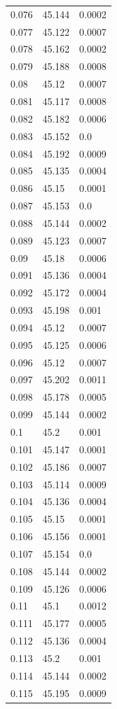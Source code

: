 \begin{table}[H]
\begin{tabular}{lll}
0.076 & 45.144 & 0.0002 \\
0.077 & 45.122 & 0.0007 \\
0.078 & 45.162 & 0.0002 \\
0.079 & 45.188 & 0.0008 \\
0.08 & 45.12 & 0.0007 \\
0.081 & 45.117 & 0.0008 \\
0.082 & 45.182 & 0.0006 \\
0.083 & 45.152 & 0.0 \\
0.084 & 45.192 & 0.0009 \\
0.085 & 45.135 & 0.0004 \\
0.086 & 45.15 & 0.0001 \\
0.087 & 45.153 & 0.0 \\
0.088 & 45.144 & 0.0002 \\
0.089 & 45.123 & 0.0007 \\
0.09 & 45.18 & 0.0006 \\
0.091 & 45.136 & 0.0004 \\
0.092 & 45.172 & 0.0004 \\
0.093 & 45.198 & 0.001 \\
0.094 & 45.12 & 0.0007 \\
0.095 & 45.125 & 0.0006 \\
0.096 & 45.12 & 0.0007 \\
0.097 & 45.202 & 0.0011 \\
0.098 & 45.178 & 0.0005 \\
0.099 & 45.144 & 0.0002 \\
0.1 & 45.2 & 0.001 \\
0.101 & 45.147 & 0.0001 \\
0.102 & 45.186 & 0.0007 \\
0.103 & 45.114 & 0.0009 \\
0.104 & 45.136 & 0.0004 \\
0.105 & 45.15 & 0.0001 \\
0.106 & 45.156 & 0.0001 \\
0.107 & 45.154 & 0.0 \\
0.108 & 45.144 & 0.0002 \\
0.109 & 45.126 & 0.0006 \\
0.11 & 45.1 & 0.0012 \\
0.111 & 45.177 & 0.0005 \\
0.112 & 45.136 & 0.0004 \\
0.113 & 45.2 & 0.001 \\
0.114 & 45.144 & 0.0002 \\
0.115 & 45.195 & 0.0009 \\

\end{tabular}
\end{table}

